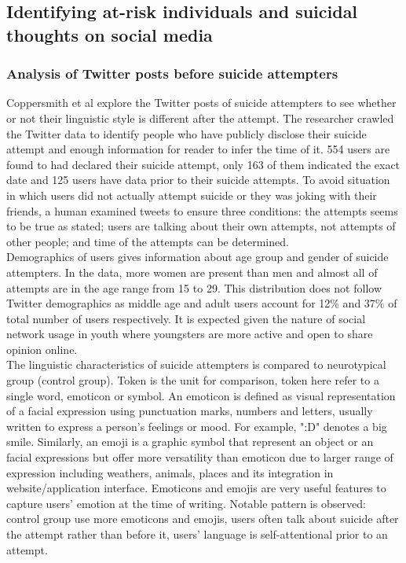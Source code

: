 \subsection{Identifying at-risk individuals and suicidal thoughts on social media}
\subsubsection*{Analysis of Twitter posts before suicide attempters}
Coppersmith et al \cite{Coppersmith2016} explore the Twitter posts of suicide attempters to see whether or not their linguistic style is different after the attempt. The researcher crawled the Twitter data to identify people who have publicly disclose their suicide attempt and enough information for reader to infer the time of it. 554 users are found to had declared their suicide attempt, only 163 of them indicated the exact date and 125 users have data prior to their suicide attempts. To avoid situation in which users did not actually attempt suicide or they was joking with their friends, a human examined tweets to ensure three conditions: the attempts seems to be true as stated; users are talking about their own attempts, not attempts of other people; and time of the attempts can be determined.\\
Demographics of users gives information about age group and gender of suicide attempters. In the data, more women are present than men and almost all of attempts are in the age range from 15 to 29. This distribution does not follow Twitter demographics as middle age and adult users account for 12\% and 37\% of total number of users respectively. It is expected given the nature of social network usage in youth where youngsters are more active and open to share opinion online.\\
The linguistic characteristics of suicide attempters is compared to neurotypical group (control group). Token is the unit for comparison, token here refer to a single word, emoticon or symbol. An emoticon is defined as visual representation of a facial expression using punctuation marks, numbers and letters, usually written to express a person's feelings or mood. For example, ":D" denotes a big smile. Similarly, an emoji is a graphic symbol that represent an object or an facial expressions but offer more versatility than emoticon due to larger range of expression including weathers, animals, places and its integration in website/application interface. Emoticons and emojis are very useful features to capture users' emotion at the time of writing. Notable pattern is observed: control group use more emoticons and emojis, users often talk about suicide after the attempt rather than before it, users' language is self-attentional prior to an attempt.\\
